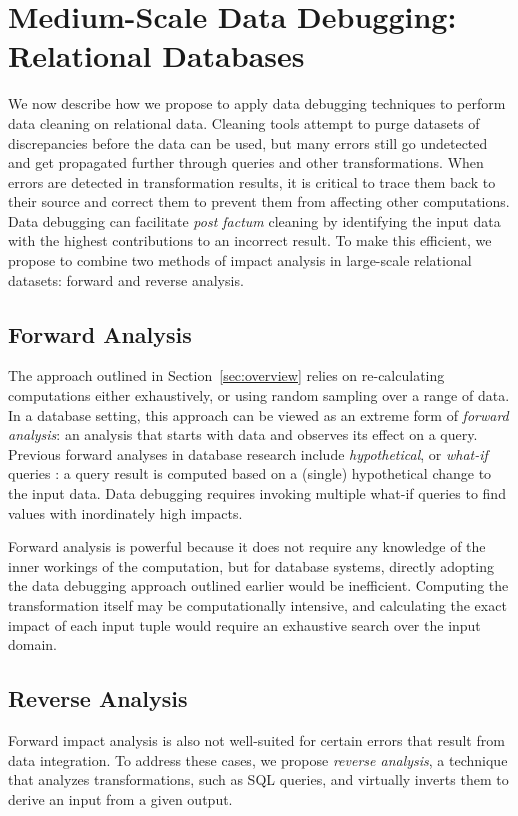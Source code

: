 \section{Medium-Scale Data Debugging: Relational Databases} %
\label{sec:bi_directional}

We now describe how we propose to apply data debugging techniques to
perform data cleaning on relational data.  Cleaning tools attempt to
purge datasets of discrepancies before the data can be used, but many
errors still go undetected and get propagated further through queries
and other transformations. When errors are detected in transformation
results, it is critical to trace them back to their source and correct
them to prevent them from affecting other computations. Data debugging
can facilitate \emph{post factum} cleaning by identifying the input
data with the highest contributions to an incorrect result. To make
this efficient, we propose to combine two methods of impact analysis
in large-scale relational datasets: forward and reverse analysis.

\subsection{Forward Analysis} %
\label{sub:forward_analysis}

The approach outlined in Section~\ref{sec:overview} relies on
re-calculating computations either exhaustively, or using random
sampling over a range of data. In a database setting, this approach
can be viewed as an extreme form of \emph{forward analysis}: an
analysis that starts with data and observes its effect on a
query. Previous forward analyses in database research include
\emph{hypothetical}, or \emph{what-if} queries
\cite{DBLP:conf/vldb/BalminPP00,DBLP:conf/icde/LakshmananRS08}: a
query result is computed based on a (single) hypothetical change to
the input data. Data debugging requires invoking multiple what-if
queries to find values with inordinately high impacts.

Forward analysis is powerful because it does not require any knowledge
of the inner workings of the computation, but for database systems,
directly adopting the data debugging approach outlined earlier would
be inefficient. Computing the transformation itself may be
computationally intensive, and calculating the exact impact of each
input tuple would require an exhaustive search over the input domain.

\subsection{Reverse Analysis} %
\label{sub:reverse_analysis}
Forward impact analysis is also not well-suited for certain errors that
result from data integration. To address these cases, we propose
\emph{reverse analysis}, a technique that analyzes transformations,
such as SQL queries, and virtually inverts them to derive an input
from a given output.

